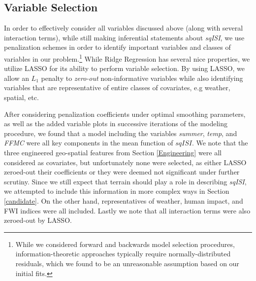 \documentclass{article}
\begin{document}
\subsection{Variable Selection}\label{Var_Sel}

In order to effectively consider all variables discussed above (along with several interaction terms), while still making inferential statements about \textit{sqISI}, we use penalization schemes in order to identify important variables and classes of variables in our problem.\footnote{While we considered forward and backwards model selection procedures, information-theoretic approaches typically require normally-distributed residuals, which we found to be an unreasonable assumption based on our initial fits.} While Ridge Regression has several nice properties, we utilize LASSO for its ability to perform variable selection. By using LASSO, we allow an $L_{1}$ penalty to \textit{zero-out} non-informative variables while also identifying variables that are representative of entire classes of covariates, e.g weather, spatial, etc.

After considering penalization coefficients under optimal smoothing parameters, as well as the added variable plots in successive iterations of the modeling procedure, we found that a model including the variables \textit{summer}, \textit{temp}, and \textit{FFMC} were all key components in the mean function of $\textit{sqISI}$. We note that the three engineered geo-spatial features from Section \ref{Engineering} were all considered as covariates, but unfortunately none were selected, as either LASSO zeroed-out their coefficients or they were deemed not significant under further scrutiny. Since we still expect that terrain should play a role in describing \textit{sqISI}, we attempted to include this information in more complex ways in Section \ref{candidate}. On the other hand, representatives of weather, human impact, and FWI indices were all included. Lastly we note that all interaction terms were also zeroed-out by LASSO.  
\end{document}
